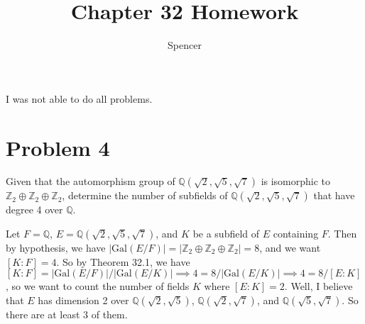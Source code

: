 \documentclass{article}
\title{Chapter 32 Homework}
\author{Spencer}
\begin{document}
\maketitle

\newcommand{\Z}{\mathbb{Z}}
\newcommand{\R}{\mathbb{R}}
\newcommand{\N}{\mathbb{N}}
\newcommand{\Q}{\mathbb{Q}}
\newcommand{\gal}{\mbox{Gal}}

I was not able to do all problems.

%
%
%
%
%

\section*{Problem 4}

Given that the automorphism group of $\Q(\sqrt{2},\sqrt{5},\sqrt{7})$ is
isomorphic to $\Z_2\oplus\Z_2\oplus\Z_2$, determine the number of subfields
of $\Q(\sqrt{2},\sqrt{5},\sqrt{7})$ that have degree 4 over $\Q$.

Let $F=\Q$, $E=\Q(\sqrt{2},\sqrt{5},\sqrt{7})$, and $K$ be a subfield
of $E$ containing $F$.  Then by hypothesis, we have
$|\gal(E/F)|=|\Z_2\oplus\Z_2\oplus\Z_2|=8$, and we want $[K:F]=4$.
So by Theorem 32.1, we have
$[K:F]=|\gal(E/F)|/|\gal(E/K)|\implies 4=8/|\gal(E/K)|\implies 4=8/[E:K]$,
so we want to count the number of fields $K$ where $[E:K]=2$.
Well, I believe that $E$ has dimension 2 over $\Q(\sqrt{2},\sqrt{5})$,
$\Q(\sqrt{2},\sqrt{7})$, and $\Q(\sqrt{5},\sqrt{7})$.  So there are
at least 3 of them.
\end{document}
